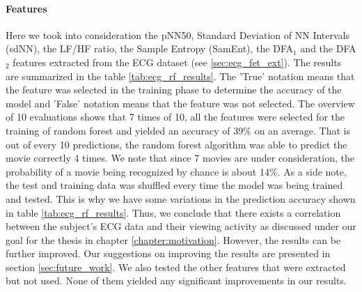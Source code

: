 \paragraph{Features} Here we took into consideration the pNN50, Standard Deviation of NN Intervals (sdNN), the LF/HF ratio, the Sample Entropy (SamEnt), the DFA$_{1}$ and the DFA$_{2}$ features extracted from the ECG dataset (see \ref{sec:ecg_fet_ext}). The results are summarized in the table \ref{tab:ecg_rf_results}. The 'True' notation means that the feature was selected in the training phase to determine the accuracy of the model and 'False' notation means that the feature was not selected. The overview of 10 evaluations shows that 7 times of 10, all the features were selected for the training of random forest and yielded an accuracy of 39\% on an average. That is out of every 10 predictions, the random forest algorithm was able to predict the movie correctly 4 times. We note that since 7 movies are under consideration, the probability of a movie being recognized by chance is about 14\%. As a side note, the test and training data was shuffled every time the model was being trained and tested. This is why we have some variations in the prediction accuracy shown in table \ref{tab:ecg_rf_results}. Thus, we conclude that there exists a correlation between the subject's ECG data and their viewing activity as discussed under our goal for the thesis in chapter \ref{chapter:motivation}. However, the results can be further improved. Our suggestions on improving the results are presented in section \ref{sec:future_work}. We also tested the other features that were extracted but not used. None of them yielded any significant improvements in our results.

